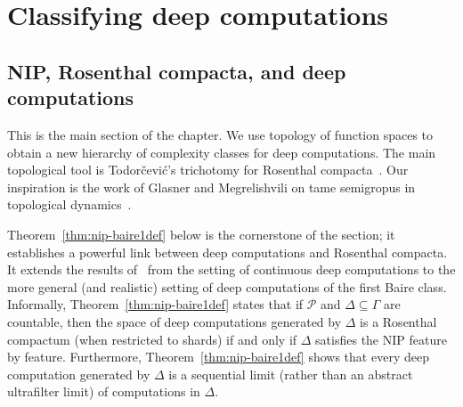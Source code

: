 
\section{Classifying deep computations}\label{sec:classification}

\subsection{NIP, Rosenthal compacta, and deep computations}

This is the main section of the chapter.
We use topology of function spaces to obtain a new hierarchy of complexity classes for deep computations.
The main topological tool is Todorčević's trichotomy for Rosenthal compacta~\cite{Todorcevic_1999_CompactSubsetsBaire}. 
Our inspiration is the work of Glasner and Megrelishvili on tame semigropus in topological dynamics~\cite{glasner2022tame}.

Theorem~\ref{thm:nip-baire1def} below is the cornerstone of the section;
it establishes a powerful link between deep computations and Rosenthal compacta.
It extends the results of~\cite{alva2024approximability} from the setting of continuous deep computations to the more general (and realistic) setting of deep computations of the first Baire class.
Informally, Theorem~\ref{thm:nip-baire1def} states that if $\mathcal{P}$ and $\Delta\subseteq\Gamma$ are countable, 
then the space of deep computations generated by $\Delta$ is a Rosenthal compactum (when restricted to shards) if and only if $\Delta$ satisfies the NIP feature by feature.
Furthermore, Theorem~\ref{thm:nip-baire1def} shows that every deep computation generated by $\Delta$ is a sequential limit (rather than an abstract ultrafilter limit) of computations in $\Delta$.

